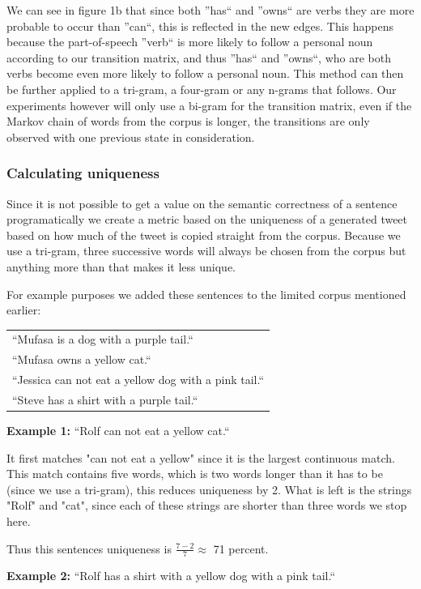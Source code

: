 \documentclass[a4paper,12pt]{article}
\begin{document}
We can see in figure 1b that since both ''has`` and ''owns`` are verbs they are more probable to occur than ''can``, this is reflected in the new edges. 
This happens because the part-of-speech ''verb`` is more likely to follow a personal noun according to our transition matrix, and thus ''has`` and ''owns``, who are 
both verbs become even more likely to follow a personal noun. This method can then be further applied to a tri-gram, a four-gram or any n-grams that follows. 
Our experiments however will only use a bi-gram for the transition matrix, even if the Markov chain of words from the corpus is longer, 
the transitions are only observed with one previous state in consideration.

\subsubsection{Calculating uniqueness}
\label{subsec:calcuniq}
Since it is not possible to get a value on the semantic correctness of a sentence programatically we create a metric based on the uniqueness of a generated tweet based on how much of the tweet is copied straight from the corpus.
Because we use a tri-gram, three successive words will always be chosen from the corpus but anything more than that makes it less unique.

For example purposes we added these sentences to the limited corpus mentioned earlier:

\begin{tabular}{l}
``Mufasa is a dog with a purple tail.``\\
``Mufasa owns a yellow cat.``\\
``Jessica can not eat a yellow dog with a pink tail.``\\
``Steve has a shirt with a purple tail.``
\end{tabular}

\textbf{Example 1:} ``Rolf can not eat a yellow cat.``
	
It first matches "can not eat a yellow" since it is the largest continuous match. This match contains five words, which is two words longer than it has to be (since we use a tri-gram), this reduces uniqueness by 2. What is left is the strings "Rolf" and "cat", since each of these strings are shorter than three words we stop here.

Thus this sentences uniqueness is $\frac{7 - 2}{7} \approx$ 71 percent.

\textbf{Example 2:} ``Rolf has a shirt with a yellow dog with a pink tail.``
	
\end{document}
